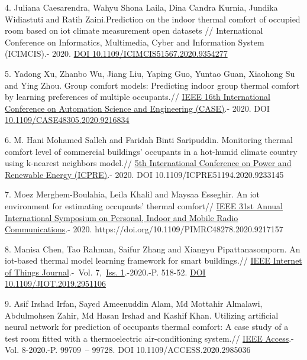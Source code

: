 4. Juliana Caesarendra, Wahyu Shona Laila, Dina Candra Kurnia, Jundika
Widiastuti and Ratih Zaini.Prediction on the indoor thermal comfort of
occupied room based on iot climate measurement open datasets //
International Conference on Informatics, Multimedia, Cyber and
Information System (ICIMCIS).- 2020.
\href{https://doi.org/10.1109/ICIMCIS51567.2020.9354277}{DOI
10.1109/ICIMCIS51567.2020.9354277}

5. Yadong Xu, Zhanbo Wu, Jiang Liu, Yaping Guo, Yuntao Guan, Xiaohong Su
and Ying Zhou. Group comfort models: Predicting indoor group thermal
comfort by learning preferences of multiple occupants.//
\href{\%20IEEE\%2016th\%20International\%20Conference\%20on\%20Automation\%20Science\%20and\%20Engineering\%20(CASE)}{IEEE
16th International Conference on Automation Science and Engineering
(CASE)}.- 2020. DOI
\href{https://doi.org/10.1109/CASE48305.2020.9216834}{10.1109/CASE48305.2020.9216834}

6. M. Hani Mohamed Salleh and Faridah Binti Saripuddin. Monitoring
thermal comfort level of commercial buildings' occupants in a hot-humid
climate country using k-nearest neighbors model.//
\href{https://ieeexplore.ieee.org/xpl/conhome/9233041/proceeding}{5th
International Conference on Power and Renewable Energy (ICPRE)}.- 2020.
DOI 10.1109/ICPRE51194.2020.9233145

7. Moez Merghem-Boulahia, Leila Khalil and Maysaa Esseghir. An iot
environment for estimating occupants' thermal comfort//
\href{https://ieeexplore.ieee.org/xpl/conhome/9210501/proceeding}{IEEE
31st Annual International Symposium on Personal, Indoor and Mobile Radio
Communications}.- 2020. https://doi.org/10.1109/PIMRC48278.2020.9217157

8. Manisa Chen, Tao Rahman, Saifur Zhang and Xiangyu Pipattanasomporn.
An iot-based thermal model learning framework for smart buildings.//
\href{https://ieeexplore.ieee.org/xpl/RecentIssue.jsp?punumber=6488907}{IEEE
Internet of Things Journal}.-~Vol.
7,~\href{https://ieeexplore.ieee.org/xpl/tocresult.jsp?isnumber=8955685&punumber=6488907}{Iss.
1}.-2020.-P. 518-52.
\href{https://doi.org/10.1109/JIOT.2019.2951106}{DOI
10.1109/JIOT.2019.2951106}

9. Asif Irshad Irfan, Sayed Ameenuddin Alam, Md Mottahir Almalawi,
Abdulmohsen Zahir, Md Hasan Irshad and Kashif Khan. Utilizing artificial
neural network for prediction of occupants thermal comfort: A case study
of a test room fitted with a thermoelectric air-conditioning system.//
\href{https://ieeexplore.ieee.org/xpl/RecentIssue.jsp?punumber=6287639}{IEEE
Access}.-Vol. 8-2020.-P. 99709~-- 99728. DOI 10.1109/ACCESS.2020.2985036

